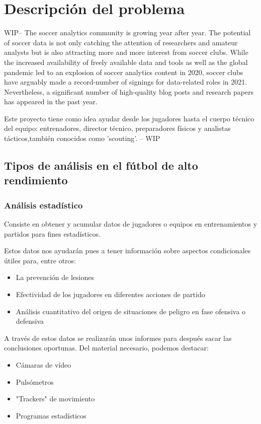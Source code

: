 \chapter{Descripción del problema}

 WIP--
The soccer analytics community is growing year after year. The potential 
of soccer data is not only catching the attention of researchers and 
amateur analysts but is also attracting more and more interest from 
soccer clubs. While the increased availability of freely available 
data and tools as well as the global pandemic led to an explosion of 
soccer analytics content in 2020, soccer clubs have arguably made a 
record-number of signings for data-related roles in 2021. Nevertheless, 
a significant number of high-quality blog posts and research papers has 
appeared in the past year. 

Este proyecto tiene como idea ayudar desde los jugadores hasta 
el cuerpo técnico del equipo: entrenadores, director técnico, preparadores 
físicos y analistas tácticos,también conocidos como 'scouting'.
-- WIP 

\section{Tipos de análisis en el fútbol de alto rendimiento}

\subsection{Análisis estadístico}
Consiste en obtener y acumular datos de jugadores o equipos 
en entrenamientos y partidos para fines estadísticos.

Estos datos nos ayudarán pues a tener información sobre aspectos condicionales 
útiles para, entre otros:

\begin{itemize}
    \item La prevención de lesiones
    \item Efectividad de los jugadores en diferentes acciones de partido
    \item Análisis cuantitativo del origen de situaciones de peligro en 
    fase ofensiva o defensiva
\end{itemize}

A través de estos datos se realizarán unos informes para después sacar las 
conclusiones oportunas. Del material necesario, podemos destacar:

\begin{itemize}
    \item Cámaras de vídeo
    \item Pulsómetros
    \item "Trackers" de movimiento
    \item Programas estadísticos
\end{itemize}

